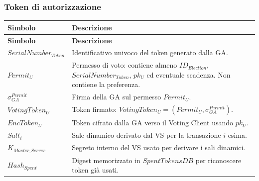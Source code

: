 \documentclass[a4paper,12pt]{article}
\begin{document}
\subsubsection{Token di autorizzazione}

\begin{longtable}{|>{\raggedright\arraybackslash}p{}|>{\raggedright\arraybackslash}p{}|}
	\hline
	\rowcolor{HeaderBlue}\textbf{Simbolo} & \textbf{Descrizione}                                                                                                                 \\
	\hline
	\endfirsthead
	\hline
	\rowcolor{HeaderBlue}\textbf{Simbolo} & \textbf{Descrizione}                                                                                                                 \\
	\hline
	\endhead
	$SerialNumber_{Token}$                & Identificativo univoco del token generato dalla GA.                                                                                  \\
	\hline
	$Permit_U$                            & Permesso di voto: contiene almeno $ID_{Election}$, $SerialNumber_{Token}$, $pk_U$ ed eventuale scadenza. Non contiene la preferenza. \\
	\hline
	$\sigma_{GA}^{Permit}$                & Firma della GA sul permesso $Permit_U$.                                                                                              \\
	\hline
	$VotingToken_U$                       & Token firmato: $VotingToken_U = (Permit_U, \sigma_{GA}^{Permit})$.                                                                   \\
	\hline
	$EncToken_U$                          & Token cifrato dalla GA verso il Voting Client usando $pk_U$.                                                                         \\
	\hline
	$Salt_i$                              & Sale dinamico derivato dal VS per la transazione $i$-esima.                                                                          \\
	\hline
	$K_{Master\_Server}$                  & Segreto interno del VS usato per derivare i sali dinamici.                                                                           \\
	\hline
	$Hash_{Spent}$                        & Digest memorizzato in $SpentTokensDB$ per riconoscere token già usati.                                                               \\
	\hline
\end{longtable}
\end{document}
